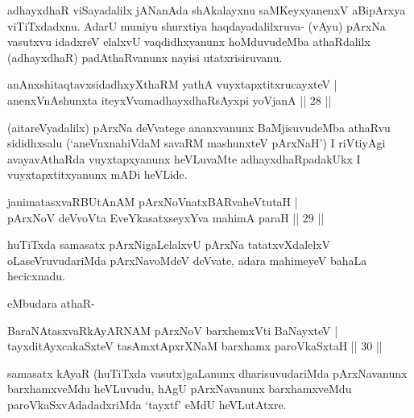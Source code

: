 \begin{artha}
adhayxdhaR viSayadalilx jANanAda shAkalayxnu saMKeyxyanenxV aBipArxya viTiTxdadxnu. AdarU muniyu shurxtiya haqdayadalilxruva- (vAyu) pArxNa vasutxvu idadxreV elalxvU vaqdidhxyanunx hoMduvudeMba athaRdalilx (adhayxdhaR) padAthaRvanunx nayisi utatxrisiruvanu.
\end{artha}


\begin{shl}
anAnxshitaqtavxsidadhxyXthaRM yathA vuyxtapxtitxrucayxteV |\\
anenxVnAshunxta iteyxVvamadhayxdhaRsAyxpi yoVjanA \hfill || 28 ||
\end{shl}

\begin{artha}
(aitareVyadalilx) pArxNa deVvatege ananxvanunx BaMjisuvudeMba athaRvu sididhx\-salu (`aneVnxnahiVdaM savaRM mashunxteV pArxNaH') I riVtiyAgi avayavAthaRda vuyxtapxyanunx heVLuvaMte adhayxdhaRpadakUkx I vuyxtapxtitxyanunx mADi heVLide.
\end{artha}


\begin{shl}
janimatasxvaRBUtAnAM pArxNoV\s natxBARvaheVtutaH |\\
pArxNoV deVvoV\s ta EveYkasatxseyxYva mahimA paraH \hfill || 29 ||
\end{shl}

\begin{artha}
huTiTxda samasatx pArxNigaLelalxvU pArxNa tatatxvXdalelxV oLaseVruvudariMda pArxNa\-voMdeV deVvate, adara mahimeyeV bahaLa hecicxnadu.
\end{artha}

 eMbudara athaR-

\begin{shl}
BaraNAtasxvaRkAyARNAM pArxNoV barxhemxVti BaNayxteV |\\
tayxditAyxcakaSxteV tasAmxtApxrXNaM barxhamx paroVkaSxtaH \hfill || 30 ||
\end{shl}

\begin{artha}
samasatx kAyaR (huTiTxda vasutx)gaLanunx dharisuvudariMda pArxNavanunx barxhamxveMdu heVLuvudu, hAgU pArxNavanunx barxhamxveMdu paroVkaSxvAdadadxriMda `tayxtf' eMdU heVLutAtxre.
\end{artha}

